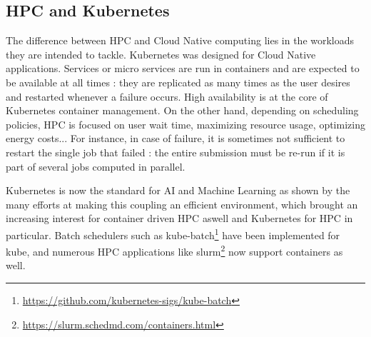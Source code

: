 \documentclass[12pt, a4paper]{memoir}
\begin{document}
\newpage %
\subsection*{HPC and Kubernetes}
The difference between HPC and Cloud Native computing lies in the workloads
they are intended to tackle.  Kubernetes was designed for Cloud Native
applications. Services or micro services are run in containers and are expected
to be available at all times : they are replicated as many times as the user
desires and restarted whenever a failure occurs. High availability is at the
core of Kubernetes container management.  On the other hand, depending on
scheduling policies, HPC is focused on user wait time, maximizing resource
usage, optimizing energy costs... For instance, in case of failure, it is
sometimes not sufficient to restart the single job that failed : the entire
submission must be re-run if it is part of several jobs computed in parallel.

Kubernetes is now the standard for AI and Machine Learning as shown by the many
efforts at making this coupling an efficient
environment\cite{lee2017design}\cite{233001}\cite{10.1145/3154842.3154845},
which brought an increasing interest for container driven HPC aswell and
Kubernetes for HPC in particular. Batch schedulers such as
kube-batch\footnote{\url{https://github.com/kubernetes-sigs/kube-batch}} have
been implemented for kube, and numerous HPC applications like
slurm\footnote{\url{https://slurm.schedmd.com/containers.html}} now support containers as well.
\end{document}
